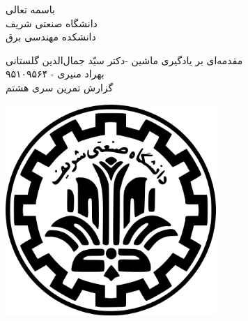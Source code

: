 \documentclass[a4paper]{article}
\begin{document}
\begin{minipage}{0.6\textwidth}

\begin{center}
	\begin{bf}
	باسمه تعالی\\
	\vspace{0.25cm}
	دانشگاه صنعتی شریف\\
	\vspace{0.25cm}
	دانشکده مهندسی برق\\
	\vspace{0.5cm}

\large
مقدمه‌ای بر یادگیری ماشین -دکتر سیّد جمال‌الدین گلستانی\\
\vspace{0.3cm}
\normalsize
بهراد منیری - ۹۵۱۰۹۵۶۴\\
\Large
\vspace{0.3cm}
گزارش  تمرین سری هشتم\\
\vspace{0.4cm}

\end{bf}
\end{center}
\end{minipage} \hfill
\begin{minipage}{0.35\textwidth}

\begin{flushleft}
\includegraphics[width=0.6\textwidth]{Shariflogo.png}\\ \large
\end{flushleft}
\end{minipage}
\end{document}
